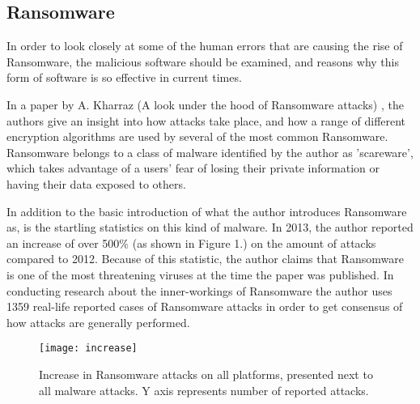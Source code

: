 \documentclass[journal,comsoc]{IEEEtran}
\begin{document}
\subsection{Ransomware}In order to look closely at some of the human errors that are causing the rise of Ransomware, the malicious software should be examined, and reasons why this form of software is so effective in current times. \par
In a paper by A. Kharraz (A look under the hood of Ransomware attacks) \cite{paper4}, the authors give an insight into how attacks take place, and how a range of different encryption algorithms are used by several of the most common Ransomware. Ransomware belongs to a class of malware identified by the author as 'scareware', which takes advantage of a users' fear of losing their private information or having their data exposed to others. \par
In addition to the basic introduction of what the author introduces Ransomware as, is the startling statistics on this kind of malware. In 2013, the author reported an increase of over 500\% (as shown in Figure 1.) on the amount of attacks compared to 2012. Because of this statistic, the author claims that Ransomware is one of the most threatening viruses at the time the paper was published. In conducting research about the inner-workings of Ransomware the author uses 1359 real-life reported cases of Ransomware attacks in order to get consensus of how attacks are generally performed. \par
\begin{figure}[H]
  \caption{Increase in Ransomware attacks on all platforms, presented next to all malware attacks. Y axis represents number of reported attacks.}
  \centering
  \label{fig:increase}
    \texttt{[image: increase]}
\end{figure}
\end{document}
